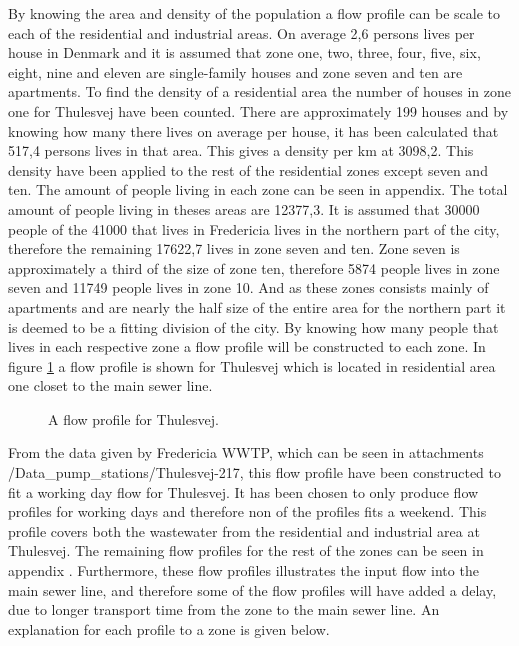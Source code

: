 By knowing the area and density of the population a flow profile can be scale to each of the residential and industrial areas. On average 2,6 persons lives per house in Denmark and it is assumed that zone one, two, three, four, five, six, eight, nine and eleven are single-family houses and zone seven and ten are apartments. To find the density of a residential area the number of houses in zone one for Thulesvej have been counted. There are approximately 199 houses and by knowing how many there lives on average per house, it has been calculated that 517,4 persons lives in that area. This gives a density per km at 3098,2. This density have been applied to the rest of the residential zones except seven and ten. The amount of people living in each zone can be seen in appendix. The total amount of people living in theses areas are 12377,3. It is assumed that 30000 people of the 41000 that lives in Fredericia lives in the northern part of the city, therefore the remaining 17622,7 lives in zone seven and ten. Zone seven is approximately a third of the size of zone ten, therefore 5874 people lives in zone seven and 11749 people lives in zone 10.  And as these zones consists mainly of apartments and are nearly the half size of the entire area for the northern part it is deemed to be a fitting division of the city. By knowing how many people that lives in each respective zone a flow profile will be constructed to each zone. In figure \ref{fig:flow_profile_thulevej} a flow profile is shown for Thulesvej which is located in residential area one closet to the main sewer line. 


\begin{figure}[H]
\centering

\caption{A flow profile for Thulesvej.}
\label{fig:flow_profile_thulevej}
\end{figure}  

From the data given by Fredericia WWTP, which can be seen in attachments /Data\_pump\_stations/Thulesvej-217, this flow profile have been constructed to fit a working day flow for Thulesvej. It has been chosen to only produce flow profiles for working days and therefore non of the profiles fits a weekend. This profile covers both the wastewater from the residential and industrial area at Thulesvej. The remaining flow profiles for the rest of the zones can be seen in appendix . Furthermore, these flow profiles illustrates the input flow into the main sewer line, and therefore some of the flow profiles will have added a delay, due to longer transport time from the zone to the main sewer line. An explanation for each profile to a zone is given below.    

